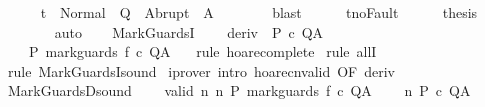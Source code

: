 \begin{isabellebody}
\ \ \ \ \isamarkupfalse%
\ {\isachardoublequoteopen}t{\isacharprime}\ {\isasymin}\ Normal\ {\isacharbackquote}\ Q\ {\isasymunion}\ Abrupt\ {\isacharbackquote}\ A{\isachardoublequoteclose}\isanewline
\ \ \ \ \ \ \isamarkupfalse%
\ blast\isanewline
\ \ \ \ \isamarkupfalse%
\ t{\isacharprime}{\isacharunderscore}noFault\isanewline
\ \ \ \ \isamarkupfalse%
\ {\isacharquery}thesis\isanewline
\ \ \ \ \ \ \isamarkupfalse%
\ auto\isanewline
\ \ \isamarkupfalse%
\isanewline
{}\isamarkupfalse%
%
\endisatagproof
{\isafoldproof}%
%
\isadelimproof
\isanewline
%
\endisadelimproof
\isanewline
{}\isamarkupfalse%
\ MarkGuardsI{\isacharcolon}\ \isanewline
\ \ \ deriv{\isacharcolon}\ {\isachardoublequoteopen}{\isasymGamma}{\isacharcomma}{\isasymTheta}{\isasymturnstile}\isactrlbsub {\isacharslash}{\isacharbraceleft}{\isacharbraceright}\isactrlesub \ P\ c\ Q{\isacharcomma}A{\isachardoublequoteclose}\isanewline
\ \ \ {\isachardoublequoteopen}{\isasymGamma}{\isacharcomma}{\isasymTheta}{\isasymturnstile}\isactrlbsub {\isacharslash}{\isacharbraceleft}{\isacharbraceright}\isactrlesub \ P\ mark{\isacharunderscore}guards\ f\ c\ Q{\isacharcomma}A{\isachardoublequoteclose}\ \ \isanewline
%
\isadelimproof
%
\endisadelimproof
%
\isatagproof
{}\isamarkupfalse%
\ {\isacharparenleft}rule\ hoare{\isacharunderscore}complete{\isacharprime}{\isacharparenright}\isanewline
{}\isamarkupfalse%
\ {\isacharparenleft}rule\ allI{\isacharparenright}\isanewline
{}\isamarkupfalse%
\ {\isacharparenleft}rule\ MarkGuardsI{\isacharunderscore}sound{\isacharparenright}\isanewline
{}\isamarkupfalse%
\ {\isacharparenleft}iprover\ intro{\isacharcolon}\ hoare{\isacharunderscore}cnvalid\ {\isacharbrackleft}OF\ deriv{\isacharbrackright}{\isacharparenright}\isanewline
{}\isamarkupfalse%
%
\endisatagproof
{\isafoldproof}%
%
\isadelimproof
\isanewline
%
\endisadelimproof
\isanewline
{}\isamarkupfalse%
\ MarkGuardsD{\isacharunderscore}sound{\isacharcolon}\ \isanewline
\ \ \ valid{\isacharcolon}\ {\isachardoublequoteopen}{\isasymforall}n{\isachardot}\ {\isasymGamma}{\isacharcomma}{\isasymTheta}{\isasymTurnstile}n{\isacharcolon}\isactrlbsub {\isacharslash}{\isacharbraceleft}{\isacharbraceright}\isactrlesub \ P\ mark{\isacharunderscore}guards\ f\ c\ Q{\isacharcomma}A{\isachardoublequoteclose}\ \isanewline
\ \ \ {\isachardoublequoteopen}{\isasymGamma}{\isacharcomma}{\isasymTheta}{\isasymTurnstile}n{\isacharcolon}\isactrlbsub {\isacharslash}{\isacharbraceleft}{\isacharbraceright}\isactrlesub \ P\ c\ Q{\isacharcomma}A{\isachardoublequoteclose}\isanewline

\end{isabellebody}
